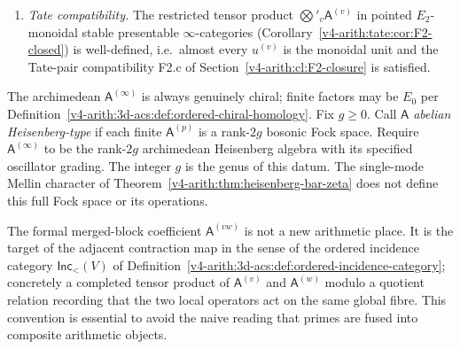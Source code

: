 \begin{definition}
\begin{enumerate}
residue operations and degree-one operators \(\tau_S\) as in
Definition~\ref{v4-arith:platonic:def:bar}, satisfying
\(D_{0,S}\tau_S+\tau_SD_{0,S}+\tau_S^2=0\) and intertwining
stage transitions. Their identification with tame-weighted chiral
operations is additional arithmetic realization data.
\item \emph{Tate compatibility.} The restricted tensor product
\(\bigotimes'_{v}\mathsf{A}^{(v)}\) in pointed \(E_{2}\)-monoidal stable
presentable \(\infty\)-categories
(Corollary~\ref{v4-arith:tate:cor:F2-closed}) is well-defined, i.e.\ almost
every \(u^{(v)}\) is the monoidal unit and the Tate-pair
compatibility F2.c of Section~\ref{v4-arith:cl:F2-closure} is satisfied.
\end{enumerate}
The archimedean \(\mathsf{A}^{(\infty)}\) is always genuinely chiral;
finite factors may be \(E_{0}\) per
Definition~\ref{v4-arith:3d-acs:def:ordered-chiral-homology}. Fix \(g\geq0\). Call \(\mathsf A\) \emph{abelian Heisenberg-type}
if each finite \(\mathsf A^{(p)}\) is a rank-\(2g\) bosonic Fock
space. Require \(\mathsf A^{(\infty)}\) to be the rank-\(2g\)
archimedean Heisenberg algebra with its specified oscillator grading.
The integer \(g\) is the genus of this datum. The single-mode Mellin character of
Theorem~\ref{v4-arith:thm:heisenberg-bar-zeta} does not define this
full Fock space or its operations.
\end{definition}

\begin{remark}
\label{v4-arith:w9-r5:rem:merged-block}
The formal merged-block coefficient \(\mathsf{A}^{(vw)}\) is not a new
arithmetic place. It is the target of the adjacent contraction map
in the sense of the ordered incidence category
\(\mathsf{Inc}_{<}(V)\) of
Definition~\ref{v4-arith:3d-acs:def:ordered-incidence-category}; concretely a
completed tensor product of \(\mathsf{A}^{(v)}\) and \(\mathsf{A}^{(w)}\)
modulo a quotient relation recording that the two local operators
act on the same global fibre. This convention is essential to avoid
the naive reading that primes are fused into composite arithmetic
objects.
\end{remark}

